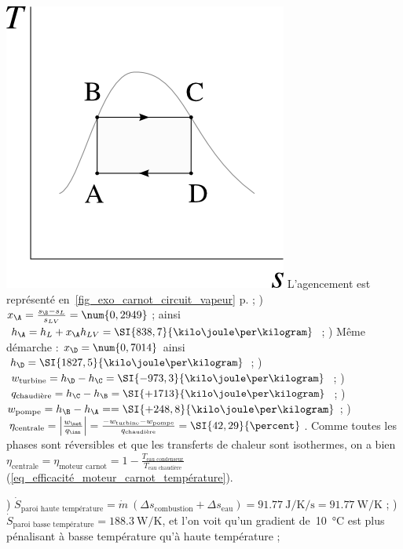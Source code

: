 \begin{description}
{		\item [\ref{exo_cycle_carnot_vapeur}]
						\includegraphics[width=\solutiondiagramwidth]{images/exo_sol_ts_carnot_vapeur1.png}
						\tab L’agencement est représenté en~\cref{fig_exo_carnot_circuit_vapeur} p.\pageref{fig_exo_carnot_circuit_vapeur} ;
						\tab{}) $x_\A = \frac{s_\B - s_L}{s_{LV}} = \num{0,2949}$ ; ainsi $h_\A = h_L + x_\A h_{LV} = \SI{838,7}{\kilo\joule\per\kilogram}$ ;
						) Même démarche : $x_\D = \num{0,7014}$ ainsi $h_\D = \SI{1827,5}{\kilo\joule\per\kilogram}$ ;
						) $w_\text{turbine} = h_\D - h_\C = \SI{-973,3}{\kilo\joule\per\kilogram}$ ;
						) $q_\text{chaudière} = h_\C - h_\B = \SI{+1713}{\kilo\joule\per\kilogram}$ ;
						) $w_\text{pompe} = h_\B - h_\A =  = \SI{+248,8}{\kilo\joule\per\kilogram}$ ;
						) $\eta_\text{centrale} = \left|\frac{w_\net}{q_\inn}\right| = \frac{-w_\text{turbine} - w_\text{pompe}}{q_\text{chaudière}} = \SI{42,29}{\percent}$. Comme toutes les phases sont réversibles et que les transferts de chaleur sont isothermes, on a bien $\eta_\text{centrale} = \eta_\text{moteur carnot} = 1 - \frac{T_\text{eau condenseur}}{T_\text{eau chaudière}}$ (\ref{eq_efficacité_moteur_carnot_température}).
		\item [\ref{exo_transferts_chaleur_irreversibles}]
						) $\dot{S}_\text{paroi haute température} = \dot{m} \ (\Delta s_\text{combustion} + \Delta s_\text{eau}) = \SI[per-mode = symbol]{+91,77}{\joule\per\kelvin\per\second} = \SI{+91,77}{\watt\per\kelvin}$ ;
						) $\dot{S}_\text{paroi basse\ température} = \SI{+188,3}{\watt\per\kelvin}$, et l’on voit qu’un gradient de~\SI{10}{\degreeCelsius} est plus pénalisant à basse température qu’à haute température ;
}
\end{description}
